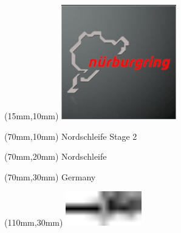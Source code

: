 \null\newpage
\begin{textblock*}{50mm}(15mm,10mm)%
\includegraphics[width=50mm]{LG/2015-05-20_00088.png}
\end{textblock*}
\begin{textblock*}{130mm}(70mm,10mm)%
{\fontsize{20}{20}\selectfont Nordschleife Stage 2}\\
\end{textblock*}
\begin{textblock*}{120mm}(70mm,20mm)%
{\fontsize{16}{16}\selectfont Nordschleife}\\
\end{textblock*}
\begin{textblock*}{120mm}(70mm,30mm)%
{\fontsize{12}{12}\selectfont Germany}
\end{textblock*}
\begin{textblock*}{30mm}(110mm,30mm)%
\centering
\includegraphics[height=15mm]{icons/tofinish.pdf}
\end{textblock*}
